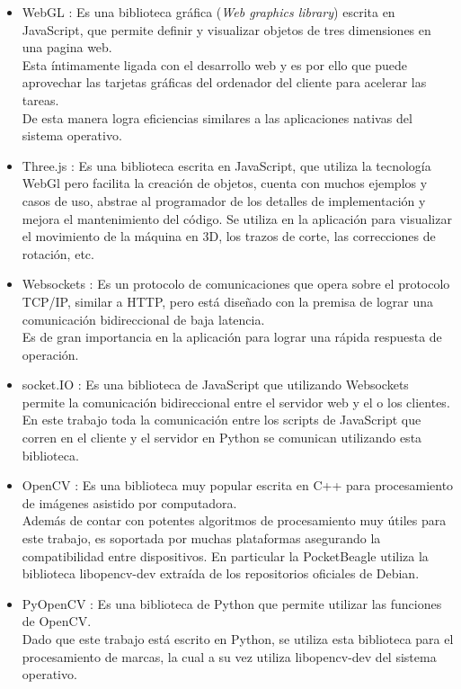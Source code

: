\begin{itemize}
{         También se utilizan bibliotecas de terceros para diferentes usos escritas en este lenguaje, lo que permite reutilizar código. \\
      }
      \item{WebGL \citep{WEBSITE:webgl}: Es una biblioteca gráfica (\textit{Web graphics library}) escrita en JavaScript, que permite definir y visualizar objetos de tres dimensiones en una pagina web.\\
         Esta íntimamente ligada con el desarrollo web y es por ello que puede aprovechar las tarjetas gráficas del ordenador del cliente para acelerar las tareas.\\
         De esta manera logra eficiencias similares a las aplicaciones nativas del sistema operativo.
      }
      \item{Three.js \citep{WEBSITE:threejs}: Es una biblioteca escrita en JavaScript, que utiliza la tecnología WebGl pero facilita la creación de objetos, cuenta con muchos ejemplos y casos de uso, abstrae al programador de los detalles de implementación y mejora el mantenimiento del código.
         Se utiliza en la aplicación para visualizar el movimiento de la máquina en 3D, los trazos de corte, las correcciones de rotación, etc.
      }
      \item{Websockets \citep{WEBSITE:websockets}: Es un protocolo de comunicaciones que opera sobre el protocolo TCP/IP, similar a HTTP, pero está diseñado con la premisa de lograr una comunicación bidireccional de baja latencia.\\
         Es de gran importancia en la aplicación para lograr una rápida respuesta de operación.
      }
      \item{socket.IO \citep{WEBSITE:socketio}: Es una biblioteca de JavaScript que utilizando Websockets permite la comunicación bidireccional entre el servidor web y el o los clientes.\\
         En este trabajo toda la comunicación entre los scripts de JavaScript que corren en el cliente y el servidor en Python se comunican utilizando esta biblioteca.
      }
   \item{OpenCV \citep{WEBSITE:opencv}: Es una biblioteca muy popular escrita en C++ para procesamiento de imágenes asistido por computadora.\\
         Además de contar con potentes algoritmos de procesamiento muy útiles para este trabajo, es soportada por muchas plataformas asegurando la compatibilidad entre dispositivos.
         En particular la PocketBeagle utiliza la biblioteca libopencv-dev extraída de los repositorios oficiales de Debian.
      }
   \item{PyOpenCV \citep{WEBSITE:pyopencv}: Es una biblioteca de Python que permite utilizar las funciones de OpenCV.\\
         Dado que este trabajo está escrito en Python, se utiliza esta biblioteca para el procesamiento de marcas, la cual a su vez utiliza libopencv-dev del sistema operativo.
      }
\end{itemize}

